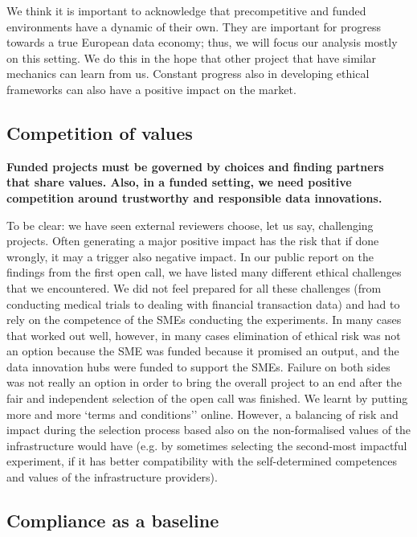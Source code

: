 \documentclass[	DIV=calc,%
							paper=a4,%
							fontsize=11pt,%
							twocolumn, draft]{scrartcl}	 					%
\begin{document}
We think it is important to acknowledge that precompetitive and funded
environments have a dynamic of their own. They are important for
progress towards a true European data economy; thus, we will focus our
analysis mostly on this setting. We do this in the hope that other
project that have similar mechanics can learn from us. Constant progress
also in developing ethical frameworks can also have a positive impact on
the market.

\subsection{Competition of values}\label{competition-of-values}

\textbf{Funded projects must be governed by choices and finding partners
that share values. Also, in a funded setting, we need positive
competition around trustworthy and responsible data innovations.}

To be clear: we have seen external reviewers choose, let us say,
challenging projects. Often generating a major positive impact has the
risk that if done wrongly, it may a trigger also negative impact. In our
public report on the findings from the first open call, we have listed
many different ethical challenges that we encountered. We did not feel
prepared for all these challenges (from conducting medical trials to
dealing with financial transaction data) and had to rely on the
competence of the SMEs conducting the experiments. In many cases that
worked out well, however, in many cases elimination of ethical risk was
not an option because the SME was funded because it promised an output,
and the data innovation hubs were funded to support the SMEs. Failure on
both sides was not really an option in order to bring the overall
project to an end after the fair and independent selection of the open
call was finished. We learnt by putting more and more `terms and
conditions'' online. However, a balancing of risk and impact during the
selection process based also on the non-formalised values of the
infrastructure would have (e.g. by sometimes selecting the second-most
impactful experiment, if it has better compatibility with the
self-determined competences and values of the infrastructure providers).

\subsection{Compliance as a baseline}\label{compliance-as-a-baseline}
\end{document}
